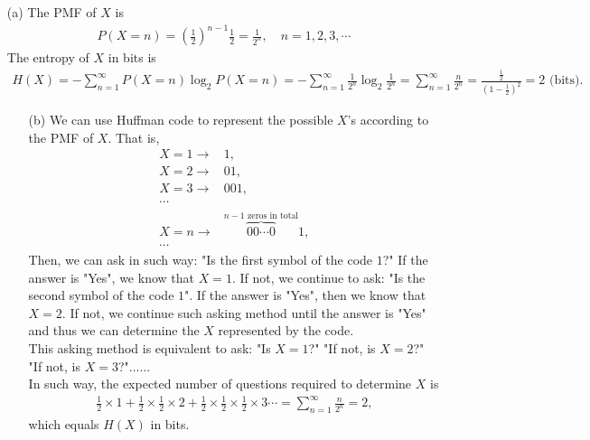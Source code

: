 \documentclass{assignment}
\begin{document}
\begin{sol}
    \begin{itemize}
        \item[(a)] The PMF of $X$ is
        \begin{align}
            P(X=n)=\left(\frac{1}{2}\right)^{n-1}\frac{1}{2}=\frac{1}{2^n},\quad n=1,2,3,\cdots
        \end{align}
        The entropy of $X$ in bits is
        \begin{align}
            H(X)=-\sum_{n=1}^{\infty}P(X=n)\log_2P(X=n)=-\sum_{n=1}^{\infty}\frac{1}{2^n}\log_2\frac{1}{2^n}=\sum_{n=1}^{\infty}\frac{n}{2^n}=\frac{\frac{1}{2}}{\left(1-\frac{1}{2}\right)^2}=2\text{ (bits)}.
        \end{align}
        \begin{itemize}
            \item[(b)] We can use Huffman code to represent the possible $X$'s according to the PMF of $X$. That is,
            \begin{align*}
                X=1\rightarrow&1,\\
                X=2\rightarrow&01,\\
                X=3\rightarrow&001,\\
                \cdots&\\
                X=n\rightarrow&\overbrace{00\cdots 0}^{n-1\text{ zeros in total}}1,\\
                \cdots&
            \end{align*}
            Then, we can ask in such way: "Is the first symbol of the code $1$?" If the answer is "Yes", we know that $X=1$. If not, we continue to ask: "Is the second symbol of the code $1$". If the answer is "Yes", then we know that $X=2$. If not, we continue such asking method until the answer is "Yes" and thus we can determine the $X$ represented by the code.\\
            This asking method is equivalent to ask: "Is $X=1$?" "If not, is $X=2$?" "If not, is $X=3$?"......\\
            In such way, the expected number of questions required to determine $X$ is
            \begin{align}
                \frac{1}{2}\times 1+\frac{1}{2}\times\frac{1}{2}\times 2+\frac{1}{2}\times\frac{1}{2}\times\frac{1}{2}\times 3\cdots=\sum_{n=1}^{\infty}\frac{n}{2^n}=2,
            \end{align}
            which equals $H(X)$ in bits.
        \end{itemize}
    \end{itemize}
\end{sol}
\end{document}

